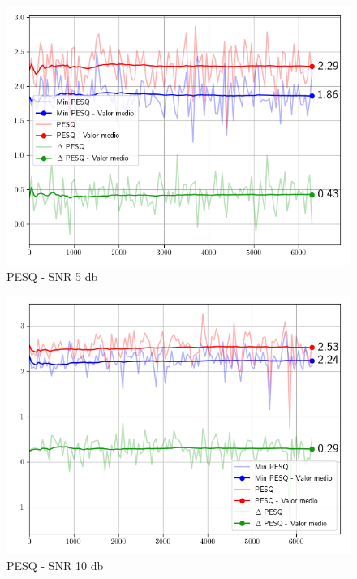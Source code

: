 \begin{figure}
	\centering
	\centerline{\includegraphics[scale=0.75]{images/ch6/af/objective_metrics/metric_PESQ_5db.png}}
	\caption{PESQ - SNR 5 db}
	\label{fig:ch6_pesq_five_db}
\end{figure}

\begin{figure}
	\centering
	\centerline{\includegraphics[scale=0.75]{images/ch6/af/objective_metrics/metric_PESQ_10db.png}}
	\caption{PESQ - SNR 10 db}
	\label{fig:ch6_pesq_ten_db}
\end{figure}

